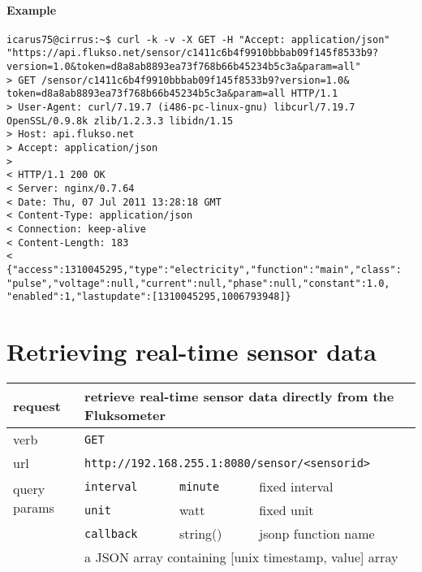 \paragraph{Example}
\begin{Verbatim}
icarus75@cirrus:~$ curl -k -v -X GET -H "Accept: application/json"
"https://api.flukso.net/sensor/c1411c6b4f9910bbbab09f145f8533b9?
version=1.0&token=d8a8ab8893ea73f768b66b45234b5c3a&param=all"
> GET /sensor/c1411c6b4f9910bbbab09f145f8533b9?version=1.0&
token=d8a8ab8893ea73f768b66b45234b5c3a&param=all HTTP/1.1
> User-Agent: curl/7.19.7 (i486-pc-linux-gnu) libcurl/7.19.7
OpenSSL/0.9.8k zlib/1.2.3.3 libidn/1.15
> Host: api.flukso.net
> Accept: application/json
> 
< HTTP/1.1 200 OK
< Server: nginx/0.7.64
< Date: Thu, 07 Jul 2011 13:28:18 GMT
< Content-Type: application/json
< Connection: keep-alive
< Content-Length: 183
< 
{"access":1310045295,"type":"electricity","function":"main","class":
"pulse","voltage":null,"current":null,"phase":null,"constant":1.0,
"enabled":1,"lastupdate":[1310045295,1006793948]}
\end{Verbatim}

\section{Retrieving real-time sensor data}
\begin{tabular}{|l|l|l|p{5cm}|}

\hline
request & \multicolumn{3}{|l|}{retrieve real-time sensor data directly from the Fluksometer} \\

\hline
verb & \multicolumn{3}{|l|}{\texttt{GET}} \\

\hline
url & \multicolumn{3}{|l|}{\texttt{http://192.168.255.1:8080/sensor/\textless sensorid\textgreater}} \\

\hline
\multirow{2}{*}{query params} & \texttt{interval} & \texttt{minute} & fixed interval \\
& \texttt{unit} & watt & fixed unit \\
& \texttt{{\small callback}} & string() & jsonp function name \\

\hline
response & \multicolumn{3}{|l|}{a JSON array containing [unix timestamp, value] array elements} \\

\hline

\end{tabular}


